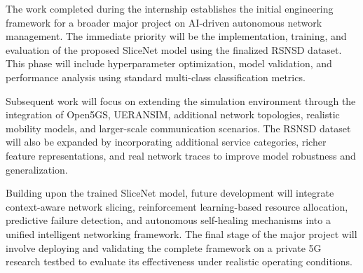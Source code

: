 \documentclass[12pt,a4paper]{report}
\begin{document}
	The work completed during the internship establishes the initial engineering framework for a broader major project on AI-driven autonomous network management. The immediate priority will be the implementation, training, and evaluation of the proposed SliceNet model using the finalized RSNSD dataset. This phase will include hyperparameter optimization, model validation, and performance analysis using standard multi-class classification metrics.
	
	Subsequent work will focus on extending the simulation environment through the integration of Open5GS, UERANSIM, additional network topologies, realistic mobility models, and larger-scale communication scenarios. The RSNSD dataset will also be expanded by incorporating additional service categories, richer feature representations, and real network traces to improve model robustness and generalization.
	
	Building upon the trained SliceNet model, future development will integrate context-aware network slicing, reinforcement learning-based resource allocation, predictive failure detection, and autonomous self-healing mechanisms into a unified intelligent networking framework. The final stage of the major project will involve deploying and validating the complete framework on a private 5G research testbed to evaluate its effectiveness under realistic operating conditions.

	
	
	
	
	
\end{document}
